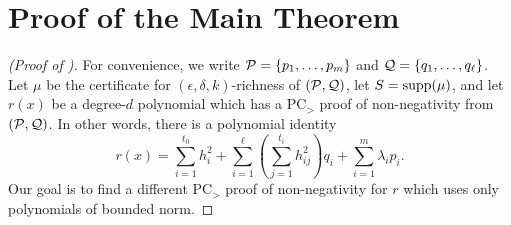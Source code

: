 \section{Proof of the Main Theorem}\label{sec:bc_proof_main}
\begin{proof}[(Proof of )]
For convenience, we write $\mathcal P = \{p_1,\dots,p_m\}$ and $\mathcal Q = \{q_1,\dots,q_\ell\}$. Let $\mu$ be the certificate for $(\epsilon,\delta,k)$-richness of $(\mathcal P,\mathcal Q)$, let $S = \operatorname{supp}(\mu)$, and let $r(x)$ be a degree-$d$ polynomial which has a PC$_>$ proof of non-negativity from $(\mathcal P,\mathcal Q)$. In other words, there is a polynomial identity
\[r(x) = \sum_{i=1}^{t_0} h_i^2 + \sum_{i=1}^\ell \left(\sum_{j=1}^{t_i} h_{ij}^2\right) q_i + \sum_{i=1}^m \lambda_i p_i.\]
Our goal is to find a different PC$_>$ proof of non-negativity for $r$ which uses only polynomials of bounded norm.


\end{proof}
